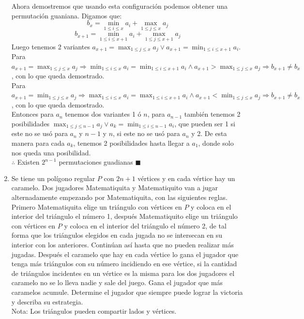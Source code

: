 \documentclass{book}
\begin{document}
\begin{enumerate}
          Ahora demostremos que usando esta configuración podemos obtener una permutación guaniana. Digamos que:
          $$b_x=\min_{1\leq i\leq x}a_i+\max_{1\leq j\leq x} a_j$$
          $$b_{x+1}=\min_{1\leq i\leq x+1}a_i+\max_{1\leq j\leq x+1} a_j$$
          Luego tenemos 2 variantes $a_{x+1}=\max_{1\leq j\leq x} a_j\vee a_{x+1}=\min_{1\leq i\leq x+1}a_i$. \\
          Para $a_{x+1}=\max_{1\leq j\leq x} a_j\Rightarrow \min_{1\leq i\leq x}a_i=\min_{1\leq i\leq x+1}a_i\wedge a_{x+1}>\max_{1\leq j\leq x} a_j\Rightarrow b_{x+1}\neq b_{x}$, con lo que queda demostrado.\\
          Para $a_{x+1}=\min_{1\leq j\leq x} a_j\Rightarrow \max_{1\leq i\leq x}a_i=\max_{1\leq i\leq x+1}a_i\wedge a_{x+1}<\min_{1\leq j\leq x} a_j\Rightarrow b_{x+1}\neq b_{x}$, con lo que queda demostrado.\\
          Entonces para $a_n$ tenemos dos variantes 1 ó $n$, para $a_{n-1}$ también tenemos 2 posibilidades $\max_{1\leq j\leq n-1} a_j\vee a_k=\min_{1\leq i\leq n-1}a_i$, que pueden ser 1 si este no se usó para $a_n$ y $n-1$ y  $n$, si este no se usó para $a_n$ y 2. De esta manera para cada $a_k$, tenemos 2 posibilidades hasta llegar a $a_1$, donde solo nos queda una posibilidad. \\
          $\therefore$ Existen $2^{n-1}$ permutaciones guadianas $\blacksquare$\\
    \item Se tiene un polígono regular $P$ con $2n+1$ vértices y en cada vértice hay un caramelo. Dos jugadores Matematiquita y Matematiquito van a jugar alternadamente empezando por Matematiquita, con las siguientes reglas. Primero Matematiquita elige un triángulo con vértices en $P$ y coloca en el interior del triángulo el número 1, después Matematiquito elige un triángulo con vértices en $P$ y coloca en el interior del triángulo el número 2, de tal forma que los triángulos elegidos en cada jugada no se intersecan en su interior con los anteriores. Continúan así hasta que no pueden realizar más jugadas. Después el caramelo que hay en cada vértice lo gana el jugador que tenga más triángulos con su número incidiendo en ese vértice, si la cantidad de triángulos incidentes en un vértice es la misma para los dos jugadores el caramelo no se lo lleva nadie y sale del juego. Gana el jugador que más caramelos acumule. Determine el jugador que siempre puede lograr la victoria y describa su estrategia.\\
          Nota: Los triángulos pueden compartir lados y vértices.\\

\end{enumerate}
\end{document}
